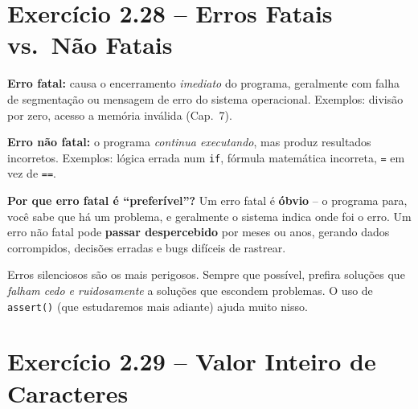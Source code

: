 \documentclass[12pt,a4paper]{article}
\begin{document}
\newpage

\section{Exercício 2.28 -- Erros Fatais vs.\ Não Fatais}

\begin{respostabox}
\textbf{Erro fatal:} causa o encerramento \textit{imediato} do programa,
geralmente com falha de segmentação ou mensagem de erro do sistema operacional.
Exemplos: divisão por zero, acesso a memória inválida (Cap.~7).

\textbf{Erro não fatal:} o programa \textit{continua executando}, mas produz
resultados incorretos. Exemplos: lógica errada num \texttt{if}, fórmula matemática
incorreta, \texttt{=} em vez de \texttt{==}.

\textbf{Por que erro fatal é ``preferível''?} Um erro fatal é \textbf{óbvio} --
o programa para, você sabe que há um problema, e geralmente o sistema indica
onde foi o erro. Um erro não fatal pode \textbf{passar despercebido} por meses
ou anos, gerando dados corrompidos, decisões erradas e bugs difíceis de
rastrear.

\begin{boaprática}
  Erros silenciosos são os mais perigosos. Sempre que possível, prefira soluções
  que \textit{falham cedo e ruidosamente} a soluções que escondem problemas. O
  uso de \texttt{assert()} (que estudaremos mais adiante) ajuda muito nisso.
\end{boaprática}
\end{respostabox}

\section{Exercício 2.29 -- Valor Inteiro de Caracteres}
\end{document}

